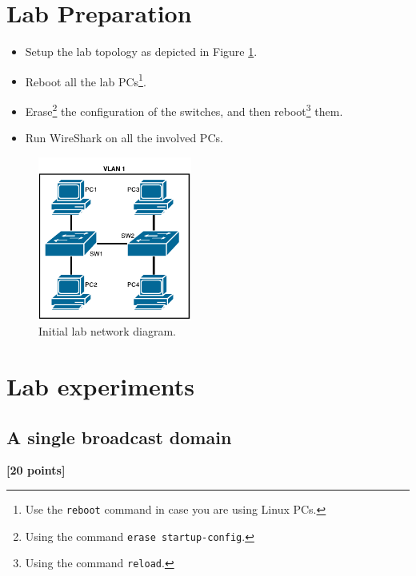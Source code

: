 \documentclass[pdftex,12pt,a4paper]{article}
\begin{document}
    \section{Lab Preparation}
        \begin{itemize}
            \item Setup the lab topology as depicted in Figure
                \ref{fig:netdiag}.
            \item Reboot all the lab PCs\footnote{Use the \texttt{reboot}
                command in case you are using Linux PCs.}.
            \item Erase\footnote{Using the command \texttt{erase
                startup-config}.} the configuration of the switches, and then
                reboot\footnote{Using the command \texttt{reload}.} them.
            \item Run WireShark on all the involved PCs.
        \end{itemize}

        \begin{figure}[tbh]
            \centering
            \includegraphics[width=0.45\textwidth]{figures/netdiag}
            \caption{Initial lab network diagram.}
            \label{fig:netdiag}
        \end{figure}

    \section{Lab experiments}
        \subsection{A single broadcast domain}
            \begin{flushright}
                \textbf{[20 points]}
            \end{flushright}
\end{document}
